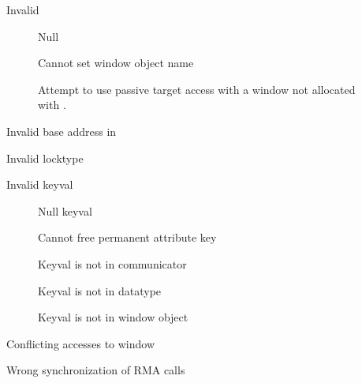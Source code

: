 \begin{description}
\item[]Invalid 
    \begin{description}
    \item[]Null 
    \item[]Cannot set window object name
    \item[]Attempt to use
    passive target access with a window not allocated with
    . 
    \end{description}
\item[]Invalid base address in 
\item[]Invalid locktype
\item[]Invalid keyval
    \begin{description}
    \item[]Null keyval
    \item[]Cannot free permanent
      attribute key
    \item[]Keyval is not in communicator
    \item[]Keyval is not in datatype
    \item[]Keyval is not in window object
    \end{description}
\item[]Conflicting accesses to window
\item[]Wrong synchronization of RMA calls

\end{description}
